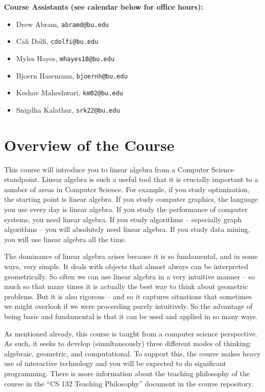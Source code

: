 \documentclass[11pt]{article}
\begin{document}
\textbf{Course Assistants (see calendar below for office hours):}  
\begin{itemize}
\item Drew Abram, \texttt{abramd@bu.edu}
\item Cali Dolfi, \texttt{cdolfi@bu.edu}
\item Myles Hayes, \texttt{mhayes18@bu.edu}
\item Bjoern Hasemann, \texttt{bjoernh@bu.edu}
\item Keshav Maheshwari, \texttt{km02@bu.edu}
\item Snigdha Kalathur, \texttt{srk22@bu.edu}
\end{itemize}

\newpage
\section*{Overview of the Course}

This course will introduce you to linear algebra from a Computer Science
standpoint.  Linear algebra is such a useful tool that it is crucially
important to a number of areas in Computer Science. For example, if you study
optimization, the starting point is linear algebra. If you study
computer graphics, the language you use every day is linear algebra. If
you study the performance of computer systems, you need linear
algebra. If you study algorithms -- especially graph algorithms -- you
will absolutely need linear algebra. If you study data mining, you will
use linear algebra all the time. 

The dominance of linear algebra arises because it is so fundamental, and
in some ways, very simple. It deals with objects that almost always can
be interpreted geometrically. So often we can use linear algebra in a
very intuitive manner -- so much so that many times it is actually the
best way to think about geometric problems. But it is also rigorous --
and so it
captures situations that sometimes we might overlook if we were
proceeding purely intuitively.  So the
advantage of being basic and fundamental is that it can be used and
applied in so many ways. 

As mentioned already, this course is taught from a computer science
perspective.  As such, it 
seeks to develop (simultaneously) three different modes of thinking:
algebraic, geometric, and computational.    To support this, the course
makes heavy use of interactive technology and you will be expected to do
significant programming.    There is more information about the teaching
philosophy of the course in the ``CS 132 Teaching Philosophy'' document
in the course repository.
\end{document}
